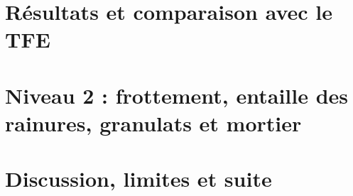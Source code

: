 \documentclass[11pt,a4paper]{article}
\begin{document}
\section{Résultats et comparaison avec le TFE}\label{sec:resultats}


\section{Niveau 2 : frottement, entaille des rainures, granulats et mortier}\label{sec:niveau2}




\section{Discussion, limites et suite}\label{sec:discussion}


\appendix
\end{document}
